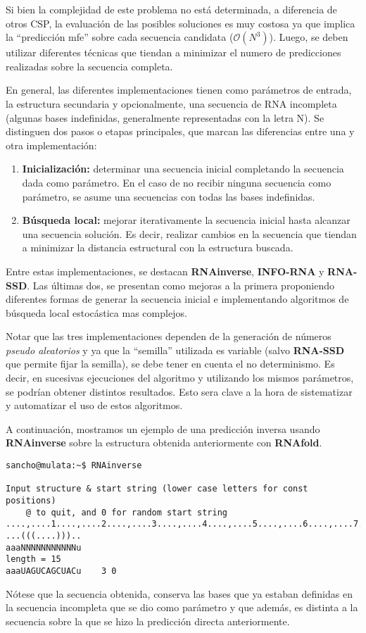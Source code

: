 Si bien la complejidad de este problema no est\'a determinada, a diferencia de
otros \ac{CSP}, la evaluaci\'on de las posibles soluciones es muy costosa ya que
implica la ``predicci\'on \ac{mfe}'' sobre cada secuencia candidata
($\mathcal{O}(N^{3})$). Luego, se deben utilizar diferentes t\'ecnicas que
tiendan a minimizar el numero de predicciones realizadas sobre la secuencia
completa.

En general, las diferentes implementaciones tienen como par\'ametros de
entrada, la estructura secundaria y opcionalmente, una secuencia de \ac{RNA}
incompleta (algunas bases indefinidas, generalmente representadas con la
letra N). Se distinguen dos pasos o etapas principales, que marcan las
diferencias entre una y otra implementaci\'on:
\begin{enumerate}
 \item \textbf{Inicializaci\'on:} determinar una secuencia inicial completando
la secuencia dada como par\'ametro. En el caso de no recibir ninguna secuencia
como par\'ametro, se asume una secuencias con todas las bases indefinidas.
 \item \textbf{B\'usqueda local:} mejorar iterativamente la secuencia inicial
hasta alcanzar una secuencia soluci\'on. Es decir, realizar cambios en la
secuencia que tiendan a minimizar la distancia estructural con la estructura
buscada.
\end{enumerate}

Entre estas implementaciones, se destacan \textbf{RNAinverse}\cite{Hofacker94},
\textbf{INFO-RNA}\cite{Busch07} y \textbf{RNA-SSD}\cite{Andronescu03}. Las
\'ultimas dos, se presentan como mejoras a la primera proponiendo diferentes
formas de generar la secuencia inicial e implementando algoritmos de b\'usqueda
local estoc\'astica mas complejos.

Notar que las tres implementaciones dependen de la generaci\'on de n\'umeros
\textit{pseudo aleatorios} y ya que la ``semilla'' utilizada es variable (salvo
\textbf{RNA-SSD} que permite fijar la semilla), se debe tener en cuenta el no
determinismo. Es decir, en sucesivas ejecuciones del algoritmo y utilizando los
mismos par\'ametros, se podr\'ian obtener distintos resultados. Esto sera clave
a la hora de sistematizar y automatizar el uso de estos algoritmos.

A continuaci\'on, mostramos un ejemplo de una predicci\'on inversa usando
\textbf{RNAinverse} sobre la estructura obtenida anteriormente con
\textbf{RNAfold}.

\begin{verbatim}
sancho@mulata:~$ RNAinverse 

Input structure & start string (lower case letters for const positions)
    @ to quit, and 0 for random start string
....,....1....,....2....,....3....,....4....,....5....,....6....,....7....,....8
...(((....)))..
aaaNNNNNNNNNNNu
length = 15
aaaUAGUCAGCUACu    3 0
\end{verbatim}

N\'otese que la secuencia obtenida, conserva las bases que ya estaban definidas
en la secuencia incompleta que se dio como par\'ametro y que adem\'as, es
distinta a la secuencia sobre la que se hizo la predicci\'on directa
anteriormente.
